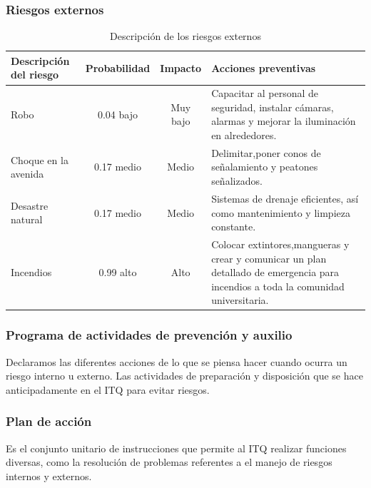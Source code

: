     \subsubsection{Riesgos externos}
    
     \begin{table}[H]
         \centering
    \caption{Descripción de los riesgos externos}
    
        \begin{tabular}{|p{7em}|c|c|p{7em}|}
             \hline
             \textbf{Descripción del riesgo}& \textbf{Probabilidad}& \textbf{Impacto}& \textbf{Acciones preventivas}\\
             \hline
             Robo & 0.04 bajo& Muy bajo& Capacitar al personal de seguridad, instalar cámaras, alarmas y mejorar la iluminación en alrededores.\\
             \hline
              Choque en la avenida& 0.17 medio & Medio& Delimitar,poner conos de señalamiento y peatones señalizados.\\
              \hline
              Desastre natural& 0.17 medio & Medio& Sistemas de drenaje eficientes, así como mantenimiento y limpieza constante.\\
              \hline
             Incendios& 0.99 alto& Alto& Colocar extintores,mangueras y crear y comunicar un plan detallado de emergencia para incendios a toda la comunidad universitaria.\\         
              \hline
    
         \end{tabular}
         \label{tab:RiesgosExternos}
    \end{table}
    \subsubsection{Programa de actividades de prevención y auxilio}
    
    Declaramos las diferentes acciones de lo que se piensa hacer cuando ocurra un riesgo interno u externo. 
    Las actividades de preparación y disposición que se hace anticipadamente en el ITQ para evitar riesgos.
    \subsubsection{Plan de acción}
    
    Es el conjunto unitario de instrucciones que permite al ITQ realizar funciones diversas, como la resolución de problemas referentes a el manejo de riesgos internos y externos.
    
